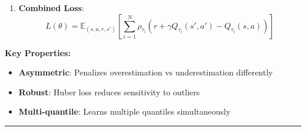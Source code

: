 \documentclass[12pt]{article}
\begin{document}
{{\begin{enumerate}
\item \textbf{Combined Loss}:
\begin{equation}
L(\theta) = \mathbb{E}_{(s,a,r,s')} \left[ \sum_{i=1}^N \rho_{\tau_i}(r + \gamma Q_{\tau_i}(s', a') - Q_{\tau_i}(s,a)) \right]
\end{equation}
\end{enumerate}

\textbf{Key Properties:}
\begin{itemize}
\item \textbf{Asymmetric}: Penalizes overestimation vs underestimation differently
\item \textbf{Robust}: Huber loss reduces sensitivity to outliers
\item \textbf{Multi-quantile}: Learns multiple quantiles simultaneously
\end{itemize}

\noindent\rule{\textwidth}{0.2pt}
}}


\newpage
\end{document}
